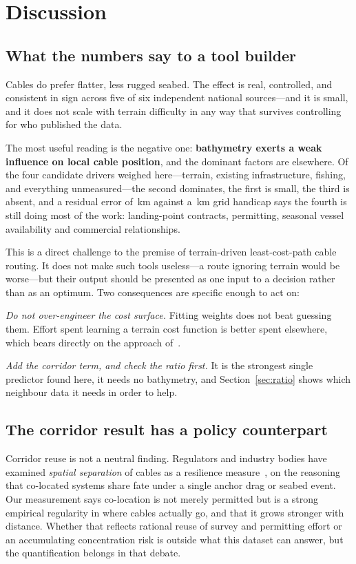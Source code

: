 \documentclass[journal]{IEEEtran}
\begin{document}
\section{Discussion}

\subsection{What the numbers say to a tool builder}
Cables do prefer flatter, less rugged seabed. The effect is real, controlled,
and consistent in sign across five of six independent national sources---and it
is small, and it does not scale with terrain difficulty in any way that
survives controlling for who published the data.

The most useful reading is the negative one: \textbf{bathymetry exerts a weak
influence on local cable position}, and the dominant factors are elsewhere. Of
the four candidate drivers weighed here---terrain, existing infrastructure,
fishing, and everything unmeasured---the second dominates, the first is small,
the third is absent, and a residual error of \nRegBoth\,km against a
\nDiscretisation\,km grid handicap says the fourth is still doing most of the
work: landing-point contracts, permitting, seasonal vessel availability and
commercial relationships.

This is a direct challenge to the premise of terrain-driven least-cost-path
cable routing. It does not make such tools useless---a route ignoring terrain
would be worse---but their output should be presented as one input to a
decision rather than as an optimum. Two consequences are specific enough to
act on:

\emph{Do not over-engineer the cost surface.} Fitting weights does not beat
guessing them. Effort spent learning a terrain cost function is better spent
elsewhere, which bears directly on the approach
of~\cite{google_patent_2021}.

\emph{Add the corridor term, and check the ratio first.} It is the strongest
single predictor found here, it needs no bathymetry, and
Section~\ref{sec:ratio} shows which neighbour data it needs in order to help.

\subsection{The corridor result has a policy counterpart}
Corridor reuse is not a neutral finding. Regulators and industry bodies have
examined \emph{spatial separation} of cables as a resilience
measure~\cite{csric2014separation}, on the reasoning that co-located systems
share fate under a single anchor drag or seabed event. Our measurement says
co-location is not merely permitted but is a strong empirical regularity in
where cables actually go, and that it grows stronger with distance. Whether
that reflects rational reuse of survey and permitting effort or an accumulating
concentration risk is outside what this dataset can answer, but the
quantification belongs in that debate.
\end{document}
